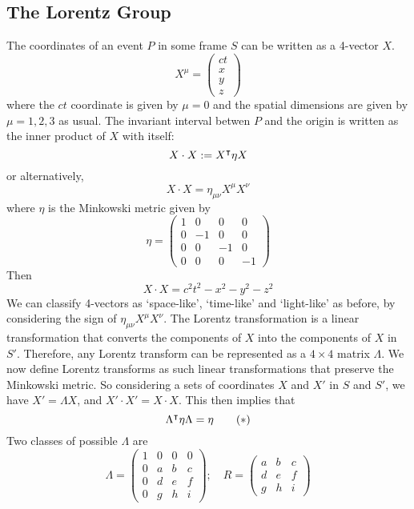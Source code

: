 \subsection{The Lorentz Group}
The coordinates of an event $P$ in some frame $S$ can be written as a 4-vector $X$.
\[ X^\mu = \begin{pmatrix}
		ct \\ x \\ y \\ z
	\end{pmatrix} \]
where the $ct$ coordinate is given by $\mu = 0$ and the spatial dimensions are given by $\mu = 1, 2, 3$ as usual. The invariant interval betwen $P$ and the origin is written as the inner product of $X$ with itself:
\[ X \cdot X := X^\intercal \eta X \]
or alternatively,
\[ X \cdot X = \eta_{\mu\nu} X^\mu X^\nu \]
where $\eta$ is the Minkowski metric given by
\[ \eta = \begin{pmatrix}
		1 & 0  & 0  & 0  \\
		0 & -1 & 0  & 0  \\
		0 & 0  & -1 & 0  \\
		0 & 0  & 0  & -1
	\end{pmatrix} \]
Then
\[ X \cdot X = c^2t^2 - x^2 - y^2 - z^2 \]
We can classify 4-vectors as `space-like', `time-like' and `light-like' as before, by considering the sign of $\eta_{\mu\nu}X^\mu X^\nu$. The Lorentz transformation is a linear transformation that converts the components of $X$ into the components of $X$ in $S'$. Therefore, any Lorentz transform can be represented as a $4\times 4$ matrix $\Lambda$. We now define Lorentz transforms as such linear transformations that preserve the Minkowski metric. So considering a sets of coordinates $X$ and $X'$ in $S$ and $S'$, we have $X' = \Lambda X$, and $X' \cdot X' = X \cdot X$. This then implies that
\begin{equation}
	\Lambda^\intercal \eta \Lambda = \eta \tag{$\ast$}
\end{equation}
Two classes of possible $\Lambda$ are
\[ \Lambda = \begin{pmatrix}
		1 & 0 & 0 & 0 \\
		0 & a & b & c \\
		0 & d & e & f \\
		0 & g & h & i
	\end{pmatrix};\quad R = \begin{pmatrix}
		a & b & c \\
		d & e & f \\
		g & h & i
	\end{pmatrix} \]
